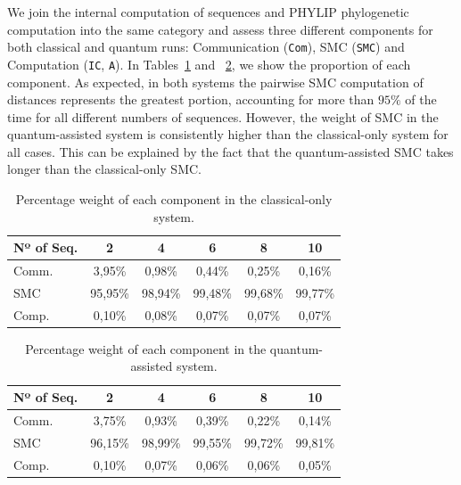 We join the internal computation of sequences and PHYLIP phylogenetic computation into the same category and assess three different components for both classical and quantum runs: Communication (\texttt{Com}), SMC (\texttt{SMC}) and Computation (\texttt{IC}, \texttt{A}). In Tables~\ref{table:classical_benchmark} and ~\ref{table:quantum_benchmark}, we show the proportion of each component. As expected, in both systems the pairwise SMC computation of distances represents the greatest portion, accounting for more than $95\%$ of the time for all different numbers of sequences. However, the weight of SMC in the quantum-assisted system is consistently higher than the classical-only system for all cases. This can be explained by the fact that the quantum-assisted SMC takes longer than the classical-only SMC.


\begin{table}[]
\centering
    \begin{tabular}{lccccc}
        \toprule
        Nº of Seq. & 2 & 4 & 6 & 8 & 10 \\
        \midrule
        Comm. & 3,95\% & 0,98\% & 0,44\% & 0,25\% & 0,16\% \\
        SMC & 95,95\% & 98,94\% & 99,48\% & 99,68\% & 99,77\% \\
        Comp. & 0,10\% & 0,08\% & 0,07\% & 0,07\% & 0,07\% \\
        \bottomrule
    \end{tabular}
\caption{Percentage weight of each component in the classical-only system.}
\label{table:classical_benchmark}
\end{table}

\begin{table}[]
\centering
    \begin{tabular}{lccccc}
        \toprule
        Nº of Seq. & 2 & 4 & 6  & 8 & 10 \\
        \midrule
        Comm. & 3,75\% & 0,93\% & 0,39\% & 0,22\% & 0,14\% \\
        SMC & 96,15\% & 98,99\% & 99,55\% & 99,72\% & 99,81\% \\
        Comp. & 0,10\% & 0,07\% & 0,06\% & 0,06\% & 0,05\% \\
        \bottomrule
    \end{tabular}
\caption{Percentage weight of each component in the quantum-assisted system.}
\label{table:quantum_benchmark}
\end{table}

